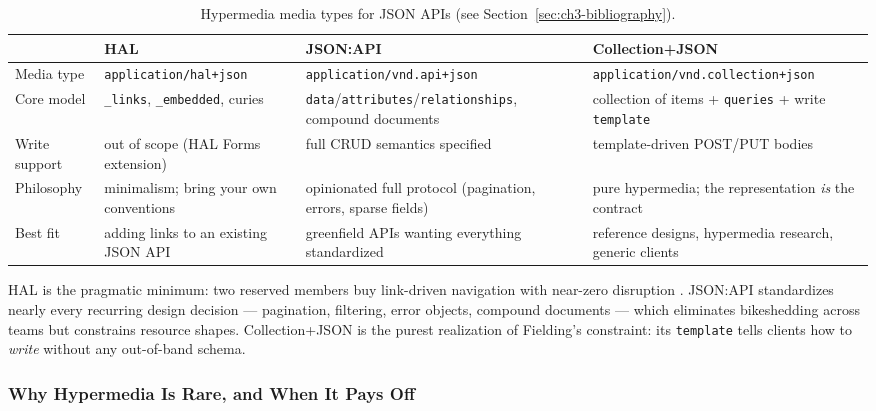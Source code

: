\begin{table}[h]
  \centering
  \small
  \begin{tabularx}{\textwidth}{l X X X}
    \toprule
    & \textbf{HAL} & \textbf{JSON:API} & \textbf{Collection+JSON} \\
    \midrule
    Media type & \texttt{application/hal+json} & \texttt{application/vnd.api+json} & \texttt{application/vnd.collection+json} \\
    Core model & \texttt{\_links}, \texttt{\_embedded}, curies & \texttt{data}/\texttt{attributes}/\texttt{relationships}, compound documents & collection of items + \texttt{queries} + write \texttt{template} \\
    Write support & out of scope (HAL Forms extension) & full CRUD semantics specified & template-driven POST/PUT bodies \\
    Philosophy & minimalism; bring your own conventions & opinionated full protocol (pagination, errors, sparse fields) & pure hypermedia; the representation \emph{is} the contract \\
    Best fit & adding links to an existing JSON API & greenfield APIs wanting everything standardized & reference designs, hypermedia research, generic clients \\
    \bottomrule
  \end{tabularx}
  \caption{Hypermedia media types for JSON APIs (see Section~\ref{sec:ch3-bibliography}).}
  \label{tab:ch3-hypermedia}
\end{table}

HAL is the pragmatic minimum: two reserved members buy link-driven navigation
with near-zero disruption \cite{rfc8288}. JSON:API standardizes nearly every
recurring design decision --- pagination, filtering, error objects, compound
documents --- which eliminates bikeshedding across teams but constrains resource
shapes. Collection+JSON is the purest realization of Fielding's constraint: its
\texttt{template} tells clients how to \emph{write} without any out-of-band
schema.

\subsubsection{Why Hypermedia Is Rare, and When It Pays Off}

